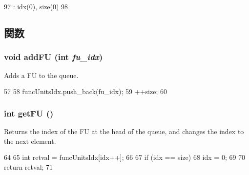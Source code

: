 \begin{DoxyCode}
97             : idx(0), size(0)
98         { }
\end{DoxyCode}


\subsection{関数}
\hypertarget{classFUPool_1_1FUIdxQueue_aba36684921ce8e9e117eeb2037c44730}{
\subsubsection[{addFU}]{\setlength{\rightskip}{0pt plus 5cm}void addFU (int {\em fu\_\-idx})}}
\label{classFUPool_1_1FUIdxQueue_aba36684921ce8e9e117eeb2037c44730}
Adds a FU to the queue. 


\begin{DoxyCode}
57 {
58     funcUnitsIdx.push_back(fu_idx);
59     ++size;
60 }
\end{DoxyCode}
\hypertarget{classFUPool_1_1FUIdxQueue_a1c9ed34bc3e46d9661f9d0cd80d67d5e}{
\subsubsection[{getFU}]{\setlength{\rightskip}{0pt plus 5cm}int getFU ()}}
\label{classFUPool_1_1FUIdxQueue_a1c9ed34bc3e46d9661f9d0cd80d67d5e}
Returns the index of the FU at the head of the queue, and changes the index to the next element. 


\begin{DoxyCode}
64 {
65     int retval = funcUnitsIdx[idx++];
66 
67     if (idx == size)
68         idx = 0;
69 
70     return retval;
71 }
\end{DoxyCode}


